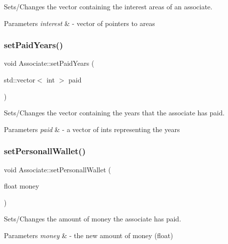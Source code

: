 Sets/\+Changes the vector containing the interest areas of an associate. 


\begin{DoxyParams}{Parameters}
{\em interest} & -\/ vector of pointers to areas \\
\hline
\end{DoxyParams}
\mbox{\label{classAssociate_a474ef6683f939d3ccec7bbbf1bd03f96}} 
\subsubsection{\texorpdfstring{set\+Paid\+Years()}{setPaidYears()}}
{\footnotesize\ttfamily void Associate\+::set\+Paid\+Years (\begin{DoxyParamCaption}\item[{std\+::vector$<$ int $>$}]{paid }\end{DoxyParamCaption})}



Sets/\+Changes the vector containing the years that the associate has paid. 


\begin{DoxyParams}{Parameters}
{\em paid} & -\/ a vector of ints representing the years \\
\hline
\end{DoxyParams}
\mbox{\label{classAssociate_a575f0c9367cb22a88737952430fe6a48}} 
\subsubsection{\texorpdfstring{set\+Personall\+Wallet()}{setPersonallWallet()}}
{\footnotesize\ttfamily void Associate\+::set\+Personall\+Wallet (\begin{DoxyParamCaption}\item[{float}]{money }\end{DoxyParamCaption})}



Sets/\+Changes the amount of money the associate has paid. 


\begin{DoxyParams}{Parameters}
{\em money} & -\/ the new amount of money (float) \\
\hline
\end{DoxyParams}
\mbox{\label{classAssociate_af44a5e1cc41845a60f17a4d23352448d}} 
